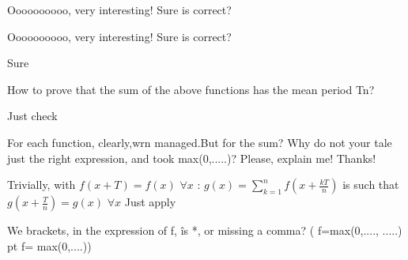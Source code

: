 \begin{solution}
	Oooooooooo, very interesting! Sure is correct?
\end{solution}



\begin{solution}
	\begin{tcolorbox}Oooooooooo, very interesting! Sure is correct?\end{tcolorbox}
Sure

\end{solution}



\begin{solution}
	\begin{tcolorbox}How to prove that the sum of the above functions has the mean period T\/n?\end{tcolorbox}

Just check
\end{solution}



\begin{solution}
	For each function, clearly,wrn managed.But for the sum? Why do not your tale just the right expression, and took max(0,.....)? Please, explain me! Thanks!
\end{solution}



\begin{solution}
	Trivially, with $f(x+T)=f(x)$ $\forall x$ :
$g(x)=\sum_{k=1}^nf(x+\frac {kT}n)$ is such that $g(x+\frac Tn)=g(x)$ $\forall x$
Just apply

\end{solution}



\begin{solution}
	We brackets, in the expression of f, îs *, or missing a comma? ( f=max(0,...., .....) pt f= max(0,....))
\end{solution}



